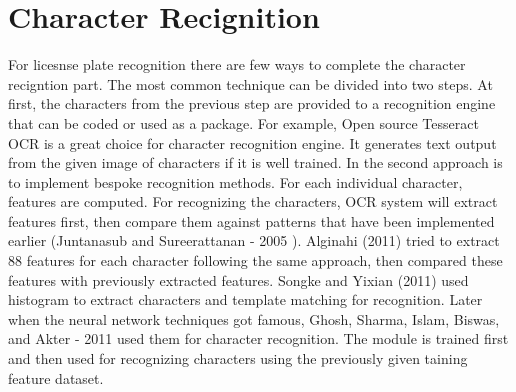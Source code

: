 \section{Character Recignition}

For licesnse plate recognition there are few ways to complete the character recigntion part. The most common technique can be divided into two steps. At first, the characters from the previous step are provided to a recognition engine that can be coded or used as a package. For example, Open source Tesseract OCR is a great choice for character recognition engine. It generates text output from the given image of characters if it is well trained. In the second approach is to implement bespoke recognition methods. For each individual character, features are computed. For recognizing the characters, OCR system will extract features first, then compare them against patterns that have been implemented earlier (Juntanasub and Sureerattanan - 2005 \cite{juntanasub2005car}). Alginahi (2011) \cite{alginahi2011automatic} tried to extract 88 features for each character following the same approach, then compared these features with previously extracted features. Songke and Yixian (2011) \cite{songke-yixian} used histogram to extract characters and template matching for recognition. Later when the neural network techniques got famous, Ghosh, Sharma, Islam, Biswas, and Akter - 2011 \cite{ghosh2011automatic} used them for character recognition. The module is trained first and then used for recognizing characters using the previously given taining feature dataset.